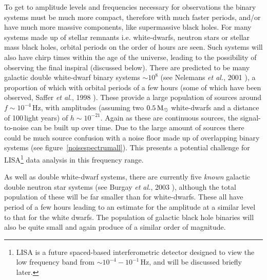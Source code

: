 To get to amplitude levels and frequencies necessary for observations the binary systems must be
much more compact, therefore with much faster periods, and/or have much more massive components,
like supermassive black holes. For many systems made up of stellar remnants i.e. white-dwarfs,
neutron stars or stellar mass black holes, orbital periods on the order of hours are seen. Such
systems will also have chirp times within the age of the universe, leading to the possibility of
observing the final inspiral (discussed below). There are predicted to be many galactic double
white-dwarf binary systems $\sim 10^8$ (see Nelemans {\it et al.}, 2001 \cite{Nelemans:2001}), a
proportion of which with orbital periods of a few hours (some of which have been observed, Saffer
{\it et al.}, 1998 \cite{Saffer:1998}). These provide a large population of sources around $f \sim
10^{-4}$\,Hz, with \gw amplitudes (assuming two $0.5\,{\rm M}_{\odot}$ white-dwarfs and a distance
of 100\,light years) of $h \sim 10^{-21}$. Again as these are continuous sources, the
signal-to-noise can be built up over time. Due to the large amount of sources there could be much
source confusion with a noise floor made up of overlapping binary systems (see
figure~\ref{noisespectrumall}). This presents a potential challenge for LISA\footnote{LISA is a
future spaced-based interferometric \gw detector designed to view the low frequency band from $\sim
10^{-4} - 10^{-1}$\,Hz, and will be discussed briefly later.} data analysis in this frequency range.

As well as double white-dwarf systems, there are currently five {\it known} galactic double neutron
star systems (see Burgay {\it et al.}, 2003 \cite{Burgay:2003}), although the total population of
these will be far smaller than for white-dwarfs. These all have period of a few hours leading to an
estimate for the amplitude at a similar level to that for the white dwarfs. The population of
galactic black hole binaries will also be quite small and again produce \gws of a similar order of
magnitude.

